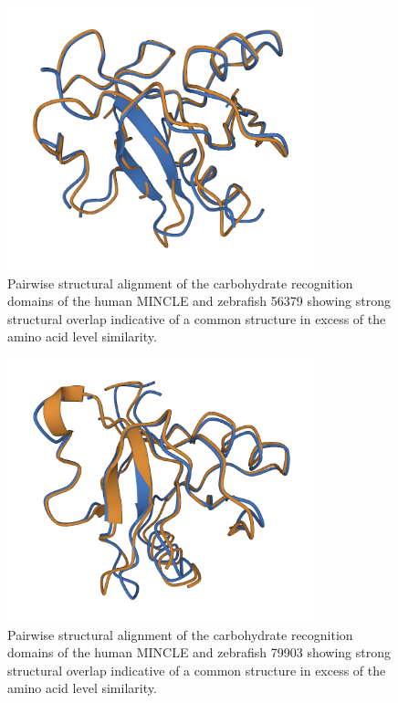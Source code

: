 \begin{figure}
\centering
\includegraphics[height=3in]{images/56379_align.png}
\caption[Structural alignment of MINCLE and 56379]{Pairwise structural alignment of the carbohydrate recognition domains of the human MINCLE and zebrafish 56379 showing strong structural overlap indicative of a common structure in excess of the amino acid level similarity.}
\label{figure:56379}
\end{figure}

\begin{figure}
\centering
\includegraphics[height=3in]{images/79903_align.png}
\caption[Structural alignment of MINCLE and 79903]{Pairwise structural alignment of the carbohydrate recognition domains of the human MINCLE and zebrafish 79903 showing strong structural overlap indicative of a common structure in excess of the amino acid level similarity.}
\label{figure:79903}
\end{figure}

